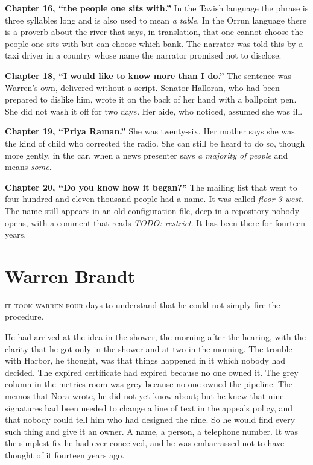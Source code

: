{\textbf{Chapter 16, ``the people one sits with.''} In the Tavish language the phrase is three syllables long and is also used to mean \emph{a table}. In the Orrun language there is a proverb about the river that says, in translation, that one cannot choose the people one sits with but can choose which bank. The narrator was told this by a taxi driver in a country whose name the narrator promised not to disclose.

\textbf{Chapter 18, ``I would like to know more than I do.''} The sentence was Warren's own, delivered without a script. Senator Halloran, who had been prepared to dislike him, wrote it on the back of her hand with a ballpoint pen. She did not wash it off for two days. Her aide, who noticed, assumed she was ill.

\textbf{Chapter 19, ``Priya Raman.''} She was twenty-six. Her mother says she was the kind of child who corrected the radio. She can still be heard to do so, though more gently, in the car, when a news presenter says \emph{a majority of people} and means \emph{some}.

\textbf{Chapter 20, ``Do you know how it began?''} The mailing list that went to four hundred and eleven thousand people had a name. It was called \emph{floor-3-west}. The name still appears in an old configuration file, deep in a repository nobody opens, with a comment that reads \emph{TODO: restrict}. It has been there for fourteen years.

}

\part{Warren Brandt}


\textsc{it took warren four} days to understand that he could not simply fire the procedure.

He had arrived at the idea in the shower, the morning after the hearing, with the clarity that he got only in the shower and at two in the morning. The trouble with Harbor, he thought, was that things happened in it which nobody had decided. The expired certificate had expired because no one owned it. The grey column in the metrics room was grey because no one owned the pipeline. The memos that Nora wrote, he did not yet know about; but he knew that nine signatures had been needed to change a line of text in the appeals policy, and that nobody could tell him who had designed the nine. So he would find every such thing and give it an owner. A name, a person, a telephone number. It was the simplest fix he had ever conceived, and he was embarrassed not to have thought of it fourteen years ago.

